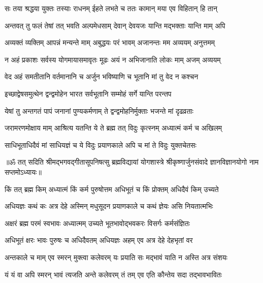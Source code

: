 \twolineshloka
{सः तया श्रद्धया युक्तः तस्याः राधनम् ईहते}
{लभते च ततः कामान् मया एव विहितान् हि तान्}%

\twolineshloka
{अन्तवत् तु फलं तेषां तत् भवति अल्पमेधसाम्}
{देवान् देवयजः यान्ति मद्भक्ताः यान्ति माम् अपि}%

\twolineshloka
{अव्यक्तं व्यक्तिम् आपन्नं मन्यन्ते माम् अबुद्धयः}
{परं भावम् अजानन्तः मम अव्ययम् अनुत्तमम्}%

\twolineshloka
{न अहं प्रकाशः सर्वस्य योगमायासमावृतः}
{मूढः अयं न अभिजानाति लोकः माम् अजम् अव्ययम्}%

\twolineshloka
{वेद अहं समतीतानि वर्तमानानि च अर्जुन}
{भविष्याणि च भूतानि मां तु वेद न कश्चन}%

\twolineshloka
{इच्छाद्वेषसमुत्थेन द्वन्द्वमोहेन भारत}
{सर्वभूतानि सम्मोहं सर्गे यान्ति परन्तप}%

\twolineshloka
{येषां तु अन्तगतं पापं जनानां पुण्यकर्मणाम्}
{ते द्वन्द्वमोहनिर्मुक्ताः भजन्ते मां दृढव्रताः}%

\twolineshloka
{जरामरणमोक्षाय माम् आश्रित्य यतन्ति ये}
{ते ब्रह्म तत् विदुः कृत्स्नम् अध्यात्मं कर्म च अखिलम्}%

\twolineshloka
{साधिभूताधिदैवं मां साधियज्ञं च ये विदुः}
{प्रयाणकाले अपि च मां ते विदुः युक्तचेतसः}%

{॥ॐ तत् सदिति श्रीमद्भगवद्गीतासूपनिषत्सु ब्रह्मविद्यायां योगशास्त्रे श्रीकृष्णार्जुनसंवादे ज्ञानविज्ञानयोगो नाम सप्तमोऽध्यायः॥}



\twolineshloka
{किं तत् ब्रह्म किम् अध्यात्मं किं कर्म पुरुषोत्तम}
{अधिभूतं च किं प्रोक्तम् अधिदैवं किम् उच्यते}%

\twolineshloka
{अधियज्ञः कथं कः अत्र देहे अस्मिन् मधुसूदन}
{प्रयाणकाले च कथं ज्ञेयः असि नियतात्मभिः}%


\twolineshloka
{अक्षरं ब्रह्म परमं स्वभावः अध्यात्मम् उच्यते}
{भूतभावोद्भवकरः विसर्गः कर्मसंज्ञितः}%

\twolineshloka
{अधिभूतं क्षरः भावः पुरुषः च अधिदैवतम्}
{अधियज्ञः अहम् एव अत्र देहे देहभृतां वर}%

\twolineshloka
{अन्तकाले च माम् एव स्मरन् मुक्त्वा कलेवरम्}
{यः प्रयाति सः मद्भावं याति न अस्ति अत्र संशयः}%

\twolineshloka
{यं यं वा अपि स्मरन् भावं त्यजति अन्ते कलेवरम्}
{तं तम् एव एति कौन्तेय सदा तद्भावभावितः}%

